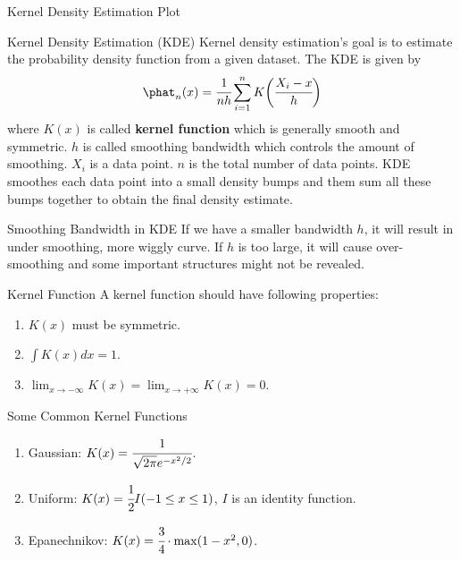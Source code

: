 \documentclass[aspectratio=169,xcolor=dvipsnames,svgnames,x11names,fleqn]{beamer}
\begin{document}
\begin{frame}[allowframebreaks]{Kernel Density Estimation Plot}
\begin{facts}{Kernel Density Estimation (KDE)}
Kernel density estimation's goal is to estimate the probability density function from a given dataset. The KDE is given by 
\begin{equation}
    \phat_n(x) = \cfrac{1}{nh}\sum_{i=1}^n K\bigg( \cfrac{X_i - x} {h}\bigg)
\end{equation}
    where $K(x)$ is called \textbf{kernel function} which is generally smooth and symmetric. $h$ is called smoothing bandwidth which controls the amount of smoothing. $X_i$ is a data point. $n$ is the total number of data points. KDE smoothes each data point into a small density bumps and them sum all these bumps together to obtain the final density estimate.
\end{facts}

\begin{gradblock}{Smoothing Bandwidth in KDE}
    If we have a smaller bandwidth $h$, it will result in under smoothing, more wiggly curve. If $h$ is too large, it will cause over-smoothing and some important structures might not be revealed.
\end{gradblock}

    
\begin{gradbox}{Kernel Function}
     A kernel function should have following properties:
     \begin{enumerate}
         \item $K(x)$ must be symmetric.
         \item $\int K(x)dx = 1$.
         \item $\lim_{x\to-\infty} K(x) = \lim_{x\to+\infty} K(x) = 0$.
     \end{enumerate}
\end{gradbox} 

\begin{facts}{Some Common Kernel Functions}
\begin{enumerate}
    \item Gaussian: $K(x)= \cfrac{1}{\sqrt{2\pi} e^{-x^2/2}}$.
    \item Uniform: $K(x) = \cfrac{1}{2}I(-1 \leq x \leq 1)$, \quad $I$ is an identity function.
    \item Epanechnikov: $K(x) = \cfrac{3}{4}\cdot \max(1 - x^2, 0)$.
\end{enumerate}
\end{facts}
\end{frame}
\end{document}
